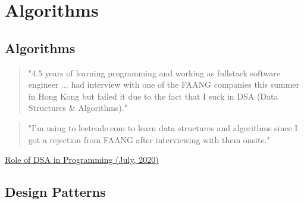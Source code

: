 \chapter{Algorithms}

\section{Algorithms}


\begin{quote}
	"4.5 years of learning programming and working as fullstack software engineer ... had interview with one of the FAANG companies this summer in Hong Kong but failed it due to the fact that I suck in DSA (Data Structures \& Algorithms)."
\end{quote}

\begin{quote}
	"I'm using to leetcode.com to learn data structures
	and algorithms since I got a rejection from FAANG after interviewing with them onsite."
\end{quote}

\href{https://blog.codechef.com/2020/07/24/the-role-of-data-structure-and-algorithms-in-programming/}{Role of DSA in Programming (July, 2020)}





\section{Design Patterns}

